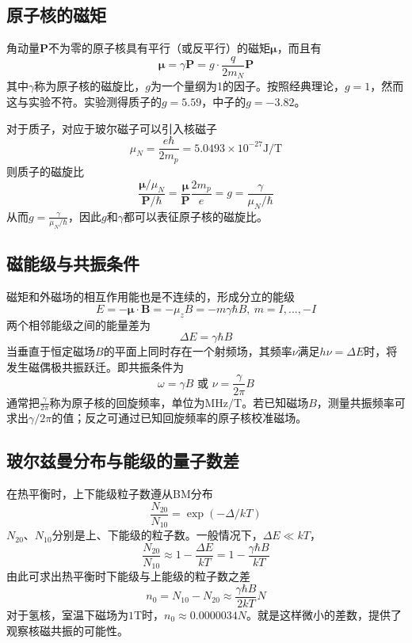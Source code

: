 \documentclass[aps,pre,12pt,preprint,onecolumn,showpacs,showkeys]{revtex4-1}
\begin{document}
\subsection{原子核的磁矩}
角动量$\bm{P}$不为零的原子核具有平行（或反平行）的磁矩$\bm{\mu}$，而且有
\begin{equation}
\bm{\mu}=\gamma \bm{P}=g \cdot \frac{q}{2m_N} \bm{P}
\end{equation}
其中$\gamma$称为原子核的磁旋比，$g$为一个量纲为1的因子。按照经典理论，$g=1$，然而这与实验不符。实验测得质子的$g=5.59$，中子的$g=-3.82$。

对于质子，对应于玻尔磁子可以引入核磁子
$$\mu_N=\frac{e\hbar}{2 m_p}=5.0493\times10^{-27} \mathrm{J/T}$$
则质子的磁旋比
\begin{equation}
\frac{\bm{\mu}/\mu_N}{\bm{P}/\hbar}=\frac{\bm{\mu}}{\bm{P}}\frac{2m_p}{e}=g=\frac{\gamma}{\mu_N/\hbar}
\end{equation}
从而$g=\frac{\gamma}{\mu_N/\hbar}$，因此$g$和$\gamma$都可以表征原子核的磁旋比。
\subsection{磁能级与共振条件}
磁矩和外磁场的相互作用能也是不连续的，形成分立的能级
$$E=-\bm{\mu}\cdot \bm{B}=-\mu_z B=-m\gamma \hbar B, \ m=I,...,-I$$
两个相邻能级之间的能量差为
$$\Delta E=\gamma \hbar B$$
当垂直于恒定磁场$B$的平面上同时存在一个射频场，其频率$\nu$满足$h\nu=\Delta E$时，将发生磁偶极共振跃迁。即共振条件为
\begin{equation}
\omega = \gamma B \mbox{ 或 }\nu=\frac{\gamma}{2\pi}B
\end{equation}
通常把$\frac{\gamma}{2\pi}$称为原子核的回旋频率，单位为$\mathrm{MHz/T}$。若已知磁场$B$，测量共振频率可求出$\gamma/2\pi$的值；反之可通过已知回旋频率的原子核校准磁场。
\subsection{玻尔兹曼分布与能级的量子数差}\label{BM}
在热平衡时，上下能级粒子数遵从BM分布
\begin{equation}
\frac{N_{20}}{N_{10}}=\exp(-\Delta/kT)
\end{equation}
$N_{20}$、$N_{10}$分别是上、下能级的粒子数。一般情况下，$\Delta E \ll kT$，
$$\frac{N_{20}}{N_{10}}\approx1-\frac{\Delta E}{kT}=1-\frac{\gamma \hbar B}{kT}$$
由此可求出热平衡时下能级与上能级的粒子数之差
\begin{equation}
n_0=N_{10}-N_{20}\approx \frac{\gamma \hbar B}{2 k T} N 
\end{equation}
对于氢核，室温下磁场为$1\mathrm T$时，$n_0\approx 0.0000034 N$。就是这样微小的差数，提供了观察核磁共振的可能性。
\end{document}
